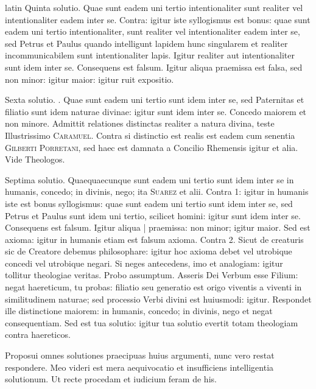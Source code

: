\begin{otherlanguage*}{latin}
\pstart
Quinta solutio. Quae sunt eadem uni tertio intentionaliter sunt realiter vel intentionaliter eadem inter se. Contra:
igitur iste syllogismus est bonus:
quae sunt eadem uni tertio intentionaliter, sunt realiter vel intentionaliter eadem inter se, sed Petrus et Paulus quando intelligunt lapidem hunc singularem et realiter incommunicabilem sunt intentionaliter lapis. Igitur realiter aut intentionaliter sunt idem inter se. Consequens est falsum. Igitur aliqua praemissa est falsa, sed non minor:
igitur maior:
igitur ruit expositio. 
\pend

\pstart
Sexta solutio. . Quae sunt eadem uni tertio sunt idem inter se, sed Paternitas et filiatio sunt idem naturae divinae:
igitur sunt idem inter se. Concedo maiorem et non minore. Admittit relationes distinctas realiter a natura divina, teste Illustrissimo \textsc{Caramuel}. Contra si distinctio est realis est eadem cum senentia \textsc{Gilberti Porretani}, sed haec est damnata a Concilio Rhemensis igitur et alia. Vide Theologos. 
\pend

\pstart
Septima solutio. Quaequaecunque sunt eadem uni tertio sunt idem inter se in humanis, concedo; in divinis, nego; ita \textsc{Suarez} et alii. Contra 1:
igitur in humanis iste est bonus syllogismus:
quae sunt eadem uni tertio sunt idem inter se, sed Petrus et Paulus sunt idem uni tertio, scilicet homini:
igitur sunt idem inter se. Consequens est falsum. Igitur aliqua \textnormal{|} praemissa:
non minor; igitur maior. Sed est axioma:
igitur in humanis etiam est falsum axioma. Contra 2. Sicut de creaturis sic de Creatore debemus philosophare:
igitur hoc axioma debet vel utrobique concedi vel utrobique negari. Si neges antecedens, imo et analogiam:
igitur tollitur theologiae veritas. Probo assumptum. Asseris Dei Verbum esse Filium:
negat haereticum, tu probas:
filiatio seu generatio est origo viventis a viventi in similitudinem naturae; sed processio Verbi divini est huiusmodi:
igitur. Respondet ille distinctione maiorem:
in humanis, concedo; in divinis, nego et negat consequentiam. Sed est tua solutio:
igitur tua solutio evertit totam theologiam contra haereticos. 
\pend

\pstart
Proposui omnes solutiones praecipuas huius argumenti, nunc vero restat respondere. Meo videri est mera aequivocatio et insufficiens intelligentia solutionum. Ut recte procedam et iudicium feram de his. 
\pend


\end{otherlanguage*}
